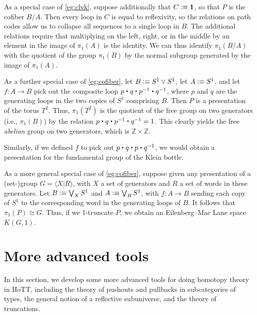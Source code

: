 \begin{eg}\label{eg:cofiber}
  As a special case of \autoref{eg:clvk}, suppose additionally that $C\vcentcolon\equiv\mathbf{1}$, so that $P$ is the cofiber $B/A$.
  Then every loop in $C$ is equal to reflexivity, so the relations on path codes allow us to collapse all sequences to a single loop in $B$.
  The additional relations require that multiplying on the left, right, or in the middle by an element in the image of $\pi_1(A)$ is the identity.
  We can thus identify $\pi_1(B/A)$ with the quotient of the group $\pi_1(B)$ by the normal subgroup generated by the image of $\pi_1(A)$.
\end{eg}

\begin{eg}\label{eg:torus}
  As a further special case of \autoref{eg:cofiber}, let $B\vcentcolon\equiv S^1 \vee S^1$, let $A\vcentcolon\equiv S^1$, and let $f:A\to B$ pick out the composite loop $p \ct q \ct \opp p \ct \opp q$, where $p$ and $q$ are the generating loops in the two copies of $S^1$ comprising $B$.
  Then $P$ is a presentation of the torus $T^2$.
  Thus, $\pi_1(T^2)$ is the quotient of the free group on two generators (i.e., $\pi_1(B)$) by the relation $p \ct q \ct \opp p \ct \opp q = 1$.
  This clearly yields the free \emph{abelian} group on two generators, which is $\mathbb{Z}\times\mathbb{Z}$.

  Similarly, if we defined $f$ to pick out $p\ct q\ct p \ct \opp q$, we would obtain a presentation for the fundamental group of the Klein bottle.
\end{eg}

\begin{eg}\label{eg:kg1}
  As a more general special case of \autoref{eg:cofiber}, suppose given any presentation of a (set-)group $G = \langle X | R \rangle$, with $X$ a set of generators and $R$ a set of words in these generators.
  Let $B\vcentcolon\equiv \bigvee_X S^1$ and $A\vcentcolon\equiv \bigvee_R S^1$, with $f:A\to B$ sending each copy of $S^1$ to the corresponding word in the generating loops of $B$.
  It follows that $\pi_1(P) \cong G$.
  Thus, if we 1-truncate $P$, we obtain an Eilenberg--Mac Lane space $K(G,1)$.
\end{eg}

\section{More advanced tools}

In this section, we develop some more advanced tools for doing homotopy
theory in HoTT, including the theory of pushouts and pullbacks in
subcategories of types, the general notion of a reflective
subuniverse, and the theory of truncations.  

